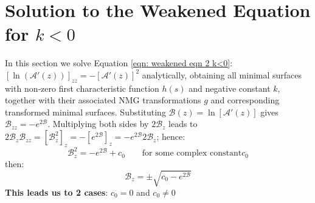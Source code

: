 \documentclass[12pt]{article}
\theoremstyle{plain}
\theoremstyle{definition}
\theoremstyle{remark}
\begin{document}
  \section{Solution to the Weakened Equation for \(k<0\)}
  In this section we solve Equation \ref{eqn: weakened eqn 2 k<0}: \([\ln(\mathcal{A}'(z))]_{zz} = -[\mathcal{A}'(z)]^2\) analytically, obtaining all minimal surfaces with non‑zero first characteristic function \(h(s)\) and negative constant \(k\), together with their associated NMG transformations \(g\) and corresponding transformed minimal surfaces. Substituting \(\mathcal{B}(z)=\ln[\mathcal{A}'(z)]\) gives \(\mathcal{B}_{zz}=-e^{2\mathcal{B}}\). Multiplying both sides by \(2\mathcal{B}_z\) leads to \(2\mathcal{B}_z\mathcal{B}_{zz}=[\mathcal{B}_z^2]_z=-[e^{2\mathcal{B}}]_z=-e^{2\mathcal{B}}2\mathcal{B}_z\); hence:
  \[
  \mathcal{B}_z^2=-e^{2\mathcal{B}}+c_0 \qquad\text{for some complex constant} c_0
  \]
  then:
  \[
   \mathcal{B}_z=\pm \sqrt{c_0-e^{2\mathcal{B}}}
  \]
  \textbf{This leads us to 2 cases}: $c_0=0$ and $c_0\neq0$
  
\end{document}
